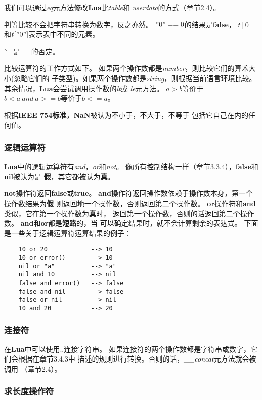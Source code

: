 \documentclass{ctexart}
\begin{document}
我们可以通过\emph{eq}元方法修改\textbf{Lua}比\emph{table}和
\emph{userdata}的方式（章节2.4）。

判等比较不会把字符串转换为数字，反之亦然。
$"0"==0$的结果是\textbf{false}，
$t[0]$和$t["0"]$表示表中不同的元素。

\~\ =是==的否定。

比较运算符的工作方式如下。
如果两个操作数都是\emph{number}，则比较它们的算术大小(忽略它们的
子类型)。如果两个操作数都是\emph{string}，则根据当前语言环境比较。
其余情况，\textbf{Lua}会尝试调用操作数的\emph{lt}或
\emph{le}元方法。
$a>b$等价于$b<a\ and\ a>=b$等价于$b<=a$。

根据\textbf{IEEE 754标准}，\textbf{NaN}被认为不小于，不大于，不等于
包括它自己在内的任何值。

\subsubsection{逻辑运算符}

\textbf{Lua}中的逻辑运算符有\emph{and}，\emph{or}和\emph{not}。
像所有控制结构一样（章节3.3.4），\textbf{false}和\textbf{nil}被认为是
\textbf{假}，其它都被认为\textbf{真}。

\textbf{not}操作符返回\textbf{false}或\textbf{true}。
\textbf{and}操作符返回操作数依赖于操作数本身，第一个操作数结果为\textbf{假}
则返回地一个操作数，否则返回第二个操作数。
\textbf{or}操作符和\textbf{and}类似，它在第一个操作数为\textbf{真}时，
返回第一个操作数，否则的话返回第二个操作数。
\textbf{and}和\textbf{or}都是\textbf{短路}的，当
可以确定结果时，就不会计算剩余的表达式。
下面是一些关于逻辑运算符运算结果的例子：

\lstset{language=C}
\begin{lstlisting}
	10 or 20            --> 10
	10 or error()       --> 10
	nil or "a"          --> "a"
	nil and 10          --> nil
	false and error()   --> false
	false and nil       --> false
	false or nil        --> nil
	10 and 20           --> 20
\end{lstlisting}

\subsubsection{连接符}

在\textbf{Lua}中可以使用..连接字符串。
如果连接符的两个操作数都是字符串或数字，它们会根据在章节3.4.3中
描述的规则进行转换。否则的话，\emph{\_\_concat}元方法就会被调用
（章节2.4）。

\subsubsection{求长度操作符}
\end{document}
